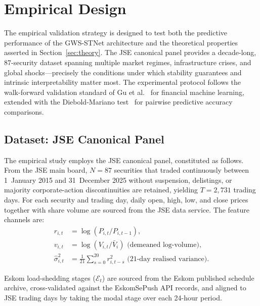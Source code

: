 \documentclass[11pt,a4paper]{article}  %
\theoremstyle{plain}
\theoremstyle{definition}
\theoremstyle{remark}
\begin{document}
\section{Empirical Design}
\label{sec:empirical}

The empirical validation strategy is designed to test both the
predictive performance of the GWS-STNet architecture and the
theoretical properties asserted in Section~\ref{sec:theory}.
The JSE canonical panel provides a decade-long, 87-security
dataset spanning multiple market regimes, infrastructure crises,
and global shocks---precisely the conditions under which
stability guarantees and intrinsic interpretability matter most.
The experimental protocol follows the walk-forward validation
standard of Gu et al.~\cite{Gu2020} for financial machine
learning, extended with the Diebold-Mariano test~\cite{Diebold1995}
for pairwise predictive accuracy comparisons.

\subsection{Dataset: JSE Canonical Panel}
\label{subsec:data}

The empirical study employs the JSE canonical panel, constituted as
follows. From the JSE main board, $N = 87$ securities that traded
continuously between 1~January 2015 and 31~December 2025 without
suspension, delistings, or majority corporate-action discontinuities
are retained, yielding $T = 2{,}731$ trading days. For each security
and trading day, daily open, high, low, and close prices together
with share volume are sourced from the JSE data service. The feature
channels are:
\begin{align*}
   r_{i,t}              &= \log(P_{i,t}/P_{i,t-1}), \\
   v_{i,t}              &= \log(V_{i,t}/\bar{V}_i)\text{ (demeaned log-volume)}, \\
   \hat{\sigma}^2_{i,t} &= \frac{1}{21}\sum_{s=0}^{20} r_{i,t-s}^2
                          \text{ (21-day realised variance)}.
\end{align*}

Eskom load-shedding stages ($\mathcal{E}_t$) are sourced from the
Eskom published schedule archive, cross-validated against the
EskomSePush API records, and aligned to JSE trading days by taking
the modal stage over each 24-hour period.
\end{document}
